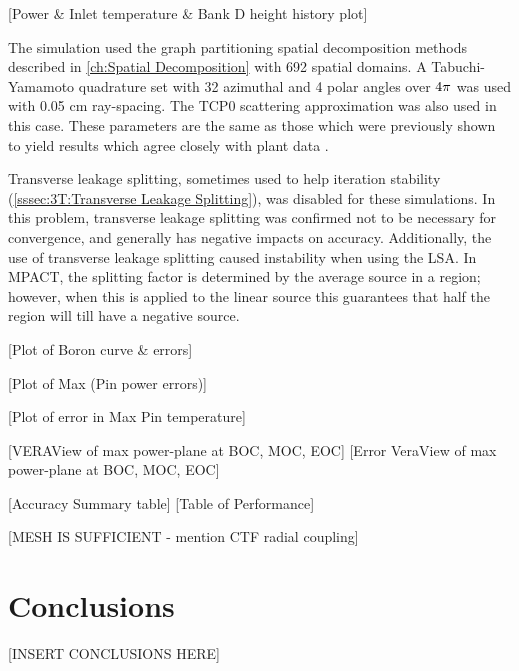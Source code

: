 {{{      [Power \& Inlet temperature \& Bank D height history plot]

      The simulation used the graph partitioning spatial decomposition methods described in \cref{ch:Spatial Decomposition} with 692 spatial domains.
      A Tabuchi-Yamamoto quadrature set with 32 azimuthal and 4 polar angles over $4\pi$ was used with 0.05 cm ray-spacing.
      The TCP0 scattering approximation was also used in this case.
      These parameters are the same as those which were previously shown to yield results which agree closely with plant data \cite{VERA}.

      Transverse leakage splitting, sometimes used to help iteration stability (\cref{sssec:3T:Transverse Leakage Splitting}), was disabled for these simulations.
      In this problem, transverse leakage splitting was confirmed not to be necessary for convergence, and generally has negative impacts on accuracy.
      Additionally, the use of transverse leakage splitting caused instability when using the \ac{LSA}.
      In MPACT, the splitting factor is determined by the average source in a region; however, when this is applied to the linear source this guarantees that half the region will till have a negative source.

      [Plot of Boron curve \& errors]

      [Plot of Max (Pin power errors)]

      [Plot of error in Max Pin temperature]

      [VERAView of max power-plane at BOC, MOC, EOC]
      [Error VeraView of max power-plane at BOC, MOC, EOC]

      [Accuracy Summary table]
      [Table of Performance]

      [MESH IS SUFFICIENT - mention CTF radial coupling]
    }
  }
  \section{Conclusions}{\label{sec:Conclusions}
    [INSERT CONCLUSIONS HERE]
  }

  \printbibliography
}